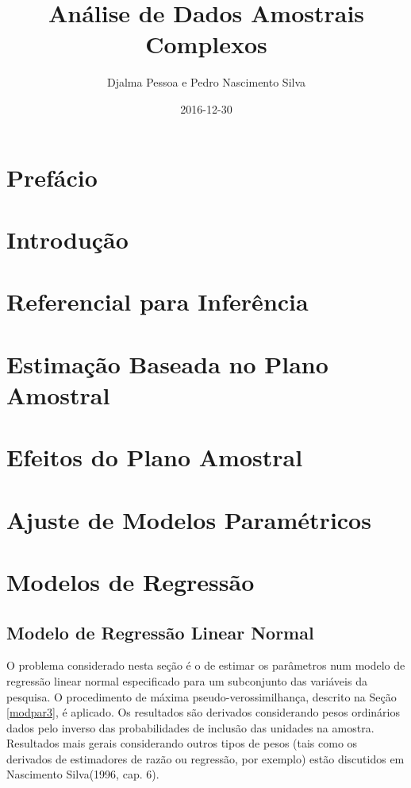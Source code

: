 \documentclass[]{book}
\title{Análise de Dados Amostrais Complexos}
\author{Djalma Pessoa e Pedro Nascimento Silva}
\date{2016-12-30}
\begin{document}
\maketitle

{
\setcounter{tocdepth}{1}
\tableofcontents
}
\chapter*{Prefácio}\label{prefacio}

\chapter{Introdução}\label{introducao}

\chapter{Referencial para Inferência}\label{referencial-para-inferencia}

\chapter{Estimação Baseada no Plano Amostral}\label{planamo}

\chapter{Efeitos do Plano Amostral}\label{efeitos-do-plano-amostral}

\chapter{Ajuste de Modelos
Paramétricos}\label{ajuste-de-modelos-parametricos}

\chapter{Modelos de Regressão}\label{modelos-de-regressao}

\section{Modelo de Regressão Linear Normal}\label{modlinear}

O problema considerado nesta seção é o de estimar os parâmetros num
modelo de regressão linear normal especificado para um subconjunto das
variáveis da pesquisa. O procedimento de máxima pseudo-verossimilhança,
descrito na Seção \ref{modpar3}, é aplicado. Os resultados são derivados
considerando pesos ordinários dados pelo inverso das probabilidades de
inclusão das unidades na amostra. Resultados mais gerais considerando
outros tipos de pesos (tais como os derivados de estimadores de razão ou
regressão, por exemplo) estão discutidos em Nascimento Silva(1996, cap.
6).
\end{document}
